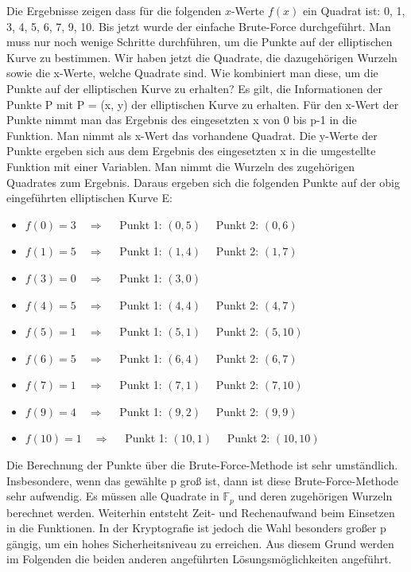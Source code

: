 Die Ergebnisse zeigen dass für die folgenden $x$-Werte $f(x)$ ein Quadrat ist: 0, 1, 3, 4, 5, 6, 7, 9, 10. Bis jetzt wurde der einfache Brute-Force durchgeführt. Man muss nur noch wenige Schritte durchführen, um die Punkte auf der elliptischen Kurve zu bestimmen. Wir haben jetzt die Quadrate, die dazugehörigen Wurzeln sowie die x-Werte, welche Quadrate sind. Wie kombiniert man diese, um die Punkte auf der elliptischen Kurve zu erhalten? Es gilt, die Informationen der Punkte P mit P = (x, y) der elliptischen Kurve zu erhalten. Für den x-Wert der Punkte nimmt man das Ergebnis des eingesetzten x von 0 bis p-1 in die Funktion. Man nimmt als x-Wert das vorhandene Quadrat. Die y-Werte der Punkte ergeben sich aus dem Ergebnis des eingesetzten x in die umgestellte Funktion mit einer Variablen. Man nimmt die Wurzeln des zugehörigen Quadrates zum Ergebnis. Daraus ergeben sich die folgenden Punkte auf der obig eingeführten elliptischen Kurve E:

\begin{itemize}
\item $f(0) = 3 \quad \Longrightarrow \quad$ Punkt 1: $(0, 5) \quad$ Punkt 2: $(0, 6)$
\item $f(1) = 5 \quad \Longrightarrow \quad$ Punkt 1: $(1, 4) \quad$ Punkt 2: $(1, 7)$
\item $f(3) = 0 \quad \Longrightarrow \quad$ Punkt 1: $(3, 0)$
\item $f(4) = 5 \quad \Longrightarrow \quad$ Punkt 1: $(4, 4) \quad$ Punkt 2: $(4, 7)$
\item $f(5) = 1 \quad \Longrightarrow \quad$ Punkt 1: $(5, 1) \quad$ Punkt 2: $(5, 10)$
\item $f(6) = 5 \quad \Longrightarrow \quad$ Punkt 1: $(6, 4) \quad$ Punkt 2: $(6, 7)$
\item $f(7) = 1 \quad \Longrightarrow \quad$ Punkt 1: $(7, 1) \quad$ Punkt 2: $(7, 10)$
\item $f(9) = 4 \quad \Longrightarrow \quad$ Punkt 1: $(9, 2) \quad$ Punkt 2: $(9, 9)$
\item $f(10) = 1 \quad \Longrightarrow \quad$ Punkt 1: $(10, 1) \quad$ Punkt 2: $(10, 10)$
\end{itemize}

Die Berechnung der Punkte über die Brute-Force-Methode ist sehr umständlich. Insbesondere, wenn das gewählte p groß ist, dann ist diese Brute-Force-Methode sehr aufwendig. Es müssen alle Quadrate in $\mathbb{F}_{p}$ und deren zugehörigen Wurzeln berechnet werden. Weiterhin entsteht Zeit- und Rechenaufwand beim Einsetzen in die Funktionen. In der Kryptografie ist jedoch die Wahl besonders großer p gängig, um ein hohes Sicherheitsniveau zu erreichen. Aus diesem Grund werden im Folgenden die beiden anderen angeführten Lösungsmöglichkeiten angeführt. 

